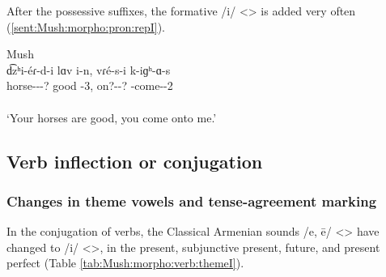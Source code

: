 After the possessive suffixes, the formative /i/ <> is added very often (\ref{sent:Mush:morpho:pron:repI}).

\begin{exe}
	\ex Mush \label{sent:Mush:morpho:pron:repI} \\ \gll 
	d͡zʰi-\'eɾ-d-i lɑv i-n, vɾ\'e-s-i k-iɡʰ-ɑ-s
	\\
	horse-{\pl}-{\possSsg}-? good {\aux}-3{\pl}, on?-{\possFsg}-? {\ind}-come-{\thgloss}-2{\sg}\\
	\trans {}\\ `Your horses are good, you come onto me.'\\
\end{exe}

\subsection{Verb inflection or conjugation}

\subsubsection{Changes in theme vowels and tense-agreement marking}
In the conjugation of verbs, the Classical Armenian sounds /e, ē/ <> have changed to /i/ <>, in the present, subjunctive present, future, and present perfect (Table \ref{tab:Mush:morpho:verb:themeI}). 


